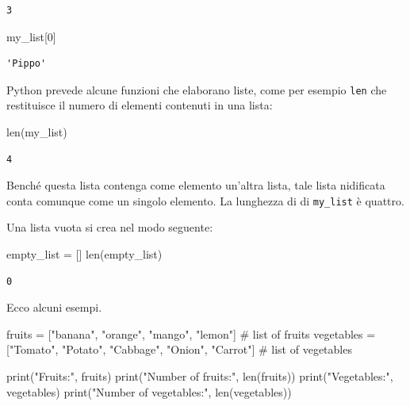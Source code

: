 \documentclass[
  letterpaper,
  krantz2]{{[}./krantz{]}}
\newenvironment{Shaded}{\begin{snugshade}}{\end{snugshade}}
\newcommand{\BuiltInTok}[1]{\textcolor[rgb]{0.00,0.23,0.31}{#1}}
\newcommand{\CommentTok}[1]{\textcolor[rgb]{0.37,0.37,0.37}{#1}}
\newcommand{\DecValTok}[1]{\textcolor[rgb]{0.68,0.00,0.00}{#1}}
\newcommand{\NormalTok}[1]{\textcolor[rgb]{0.00,0.23,0.31}{#1}}
\newcommand{\OperatorTok}[1]{\textcolor[rgb]{0.37,0.37,0.37}{#1}}
\newcommand{\StringTok}[1]{\textcolor[rgb]{0.13,0.47,0.30}{#1}}
\begin{document}
\begin{verbatim}
3
\end{verbatim}

\begin{Shaded}
\begin{Highlighting}[]
\NormalTok{my\_list[}\DecValTok{0}\NormalTok{]}
\end{Highlighting}
\end{Shaded}

\begin{verbatim}
'Pippo'
\end{verbatim}

Python prevede alcune funzioni che elaborano liste, come per esempio
\texttt{len} che restituisce il numero di elementi contenuti in una
lista:

\begin{Shaded}
\begin{Highlighting}[]
\BuiltInTok{len}\NormalTok{(my\_list)}
\end{Highlighting}
\end{Shaded}

\begin{verbatim}
4
\end{verbatim}

Benché questa lista contenga come elemento un'altra lista, tale lista
nidificata conta comunque come un singolo elemento. La lunghezza di di
\texttt{my\_list} è quattro.

Una lista vuota si crea nel modo seguente:

\begin{Shaded}
\begin{Highlighting}[]
\NormalTok{empty\_list }\OperatorTok{=}\NormalTok{ []}
\BuiltInTok{len}\NormalTok{(empty\_list)}
\end{Highlighting}
\end{Shaded}

\begin{verbatim}
0
\end{verbatim}

Ecco alcuni esempi.

\begin{Shaded}
\begin{Highlighting}[]
\NormalTok{fruits }\OperatorTok{=}\NormalTok{ [}\StringTok{"banana"}\NormalTok{, }\StringTok{"orange"}\NormalTok{, }\StringTok{"mango"}\NormalTok{, }\StringTok{"lemon"}\NormalTok{]  }\CommentTok{\# list of fruits}
\NormalTok{vegetables }\OperatorTok{=}\NormalTok{ [}\StringTok{"Tomato"}\NormalTok{, }\StringTok{"Potato"}\NormalTok{, }\StringTok{"Cabbage"}\NormalTok{, }\StringTok{"Onion"}\NormalTok{, }\StringTok{"Carrot"}\NormalTok{]  }\CommentTok{\# list of vegetables}

\BuiltInTok{print}\NormalTok{(}\StringTok{"Fruits:"}\NormalTok{, fruits)}
\BuiltInTok{print}\NormalTok{(}\StringTok{"Number of fruits:"}\NormalTok{, }\BuiltInTok{len}\NormalTok{(fruits))}
\BuiltInTok{print}\NormalTok{(}\StringTok{"Vegetables:"}\NormalTok{, vegetables)}
\BuiltInTok{print}\NormalTok{(}\StringTok{"Number of vegetables:"}\NormalTok{, }\BuiltInTok{len}\NormalTok{(vegetables))}
\end{Highlighting}
\end{Shaded}
\end{document}
